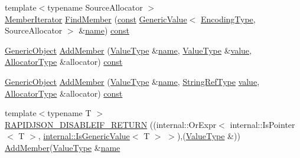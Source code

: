 \begin{DoxyCompactItemize}
{\footnotesize template$<$typename Source\+Allocator $>$ }\\\hyperlink{classGenericObject_a1f531d70f8d57ed30199ac445b5935e6}{Member\+Iterator} \hyperlink{classGenericObject_a12a4fbbf2219d6bb43c3d61923830ab4}{Find\+Member} (\hyperlink{classGenericObject_af70c9646b5e422306c33e98b3d8783a7}{const} \hyperlink{classGenericValue}{Generic\+Value}$<$ \hyperlink{classGenericObject_a96ebfdde095e2ce42535d15ae5dc58ef}{Encoding\+Type}, Source\+Allocator $>$ \&\hyperlink{imgui__impl__opengl3__loader_8h_a5c4947d4516dd7cfa3505ce3a648a4ef}{name}) \hyperlink{classGenericObject_af70c9646b5e422306c33e98b3d8783a7}{const}
\item 
\hyperlink{classGenericObject}{Generic\+Object} \hyperlink{classGenericObject_a3668524c8566c46cbae97d938064f5fa}{Add\+Member} (\hyperlink{classGenericObject_a930aa30f89caee7ba7bff60bf9dc21b1}{Value\+Type} \&\hyperlink{imgui__impl__opengl3__loader_8h_a5c4947d4516dd7cfa3505ce3a648a4ef}{name}, \hyperlink{classGenericObject_a930aa30f89caee7ba7bff60bf9dc21b1}{Value\+Type} \&\hyperlink{imgui__impl__opengl3__loader_8h_a32aff7c6c4cd253fdf6563677afab5ce}{value}, \hyperlink{classGenericObject_a00c8cee952d5ebadc5e1c309aa489ad9}{Allocator\+Type} \&allocator) \hyperlink{classGenericObject_af70c9646b5e422306c33e98b3d8783a7}{const}
\item 
\hyperlink{classGenericObject}{Generic\+Object} \hyperlink{classGenericObject_ae871adc8c906a72878b7cf5df279ed1f}{Add\+Member} (\hyperlink{classGenericObject_a930aa30f89caee7ba7bff60bf9dc21b1}{Value\+Type} \&\hyperlink{imgui__impl__opengl3__loader_8h_a5c4947d4516dd7cfa3505ce3a648a4ef}{name}, \hyperlink{classGenericObject_a9b8381fc96f5f89b2163b052ed66cc59}{String\+Ref\+Type} \hyperlink{imgui__impl__opengl3__loader_8h_a32aff7c6c4cd253fdf6563677afab5ce}{value}, \hyperlink{classGenericObject_a00c8cee952d5ebadc5e1c309aa489ad9}{Allocator\+Type} \&allocator) \hyperlink{classGenericObject_af70c9646b5e422306c33e98b3d8783a7}{const}
\item 
{\footnotesize template$<$typename T $>$ }\\\hyperlink{classGenericObject_a98ebcec632c41442d89cd8634b7ecc47}{R\+A\+P\+I\+D\+J\+S\+O\+N\+\_\+\+D\+I\+S\+A\+B\+L\+E\+I\+F\+\_\+\+R\+E\+T\+U\+RN} ((internal\+::\+Or\+Expr$<$ internal\+::\+Is\+Pointer$<$ T $>$, \hyperlink{structinternal_1_1IsGenericValue}{internal\+::\+Is\+Generic\+Value}$<$ T $>$ $>$),(\hyperlink{classGenericObject_a930aa30f89caee7ba7bff60bf9dc21b1}{Value\+Type} \&)) \hyperlink{classGenericObject_a3668524c8566c46cbae97d938064f5fa}{Add\+Member}(\hyperlink{classGenericObject_a930aa30f89caee7ba7bff60bf9dc21b1}{Value\+Type} \&\hyperlink{imgui__impl__opengl3__loader_8h_a5c4947d4516dd7cfa3505ce3a648a4ef}{name}

\end{DoxyCompactItemize}
